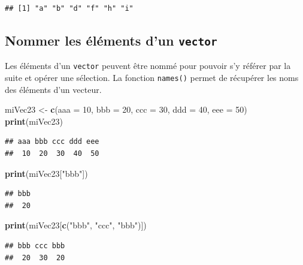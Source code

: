 \documentclass[]{book}
\newenvironment{Shaded}{\begin{snugshade}}{\end{snugshade}}
\newcommand{\DataTypeTok}[1]{\textcolor[rgb]{0.13,0.29,0.53}{#1}}
\newcommand{\DecValTok}[1]{\textcolor[rgb]{0.00,0.00,0.81}{#1}}
\newcommand{\KeywordTok}[1]{\textcolor[rgb]{0.13,0.29,0.53}{\textbf{#1}}}
\newcommand{\NormalTok}[1]{#1}
\newcommand{\StringTok}[1]{\textcolor[rgb]{0.31,0.60,0.02}{#1}}
\begin{document}
\begin{verbatim}
## [1] "a" "b" "d" "f" "h" "i"
\end{verbatim}

\hypertarget{nommer-les-elements-dun-vector}{%
\subsection{\texorpdfstring{Nommer les éléments d'un \texttt{vector}}{Nommer les éléments d'un vector}}\label{nommer-les-elements-dun-vector}}

Les éléments d'un \texttt{vector} peuvent être nommé pour pouvoir s'y référer par la suite et opérer une sélection. La fonction \texttt{names()} permet de récupérer les noms des éléments d'un vecteur.

\begin{Shaded}
\begin{Highlighting}[]
\NormalTok{miVec23 <-}\StringTok{ }\KeywordTok{c}\NormalTok{(}\DataTypeTok{aaa =} \DecValTok{10}\NormalTok{, }\DataTypeTok{bbb =} \DecValTok{20}\NormalTok{, }\DataTypeTok{ccc =} \DecValTok{30}\NormalTok{, }\DataTypeTok{ddd =} \DecValTok{40}\NormalTok{, }\DataTypeTok{eee =} \DecValTok{50}\NormalTok{)}
\KeywordTok{print}\NormalTok{(miVec23)}
\end{Highlighting}
\end{Shaded}

\begin{verbatim}
## aaa bbb ccc ddd eee 
##  10  20  30  40  50
\end{verbatim}

\begin{Shaded}
\begin{Highlighting}[]
\KeywordTok{print}\NormalTok{(miVec23[}\StringTok{"bbb"}\NormalTok{])}
\end{Highlighting}
\end{Shaded}

\begin{verbatim}
## bbb 
##  20
\end{verbatim}

\begin{Shaded}
\begin{Highlighting}[]
\KeywordTok{print}\NormalTok{(miVec23[}\KeywordTok{c}\NormalTok{(}\StringTok{"bbb"}\NormalTok{, }\StringTok{"ccc"}\NormalTok{, }\StringTok{"bbb"}\NormalTok{)])}
\end{Highlighting}
\end{Shaded}

\begin{verbatim}
## bbb ccc bbb 
##  20  30  20
\end{verbatim}
\end{document}
